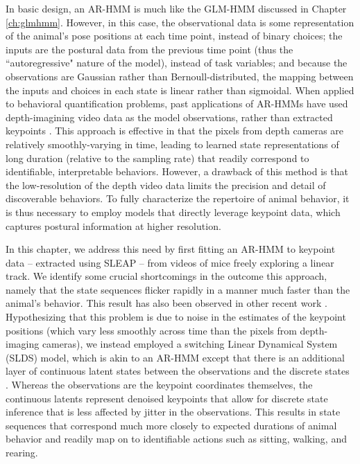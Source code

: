 In basic design, an AR-HMM is much like the GLM-HMM discussed in Chapter \ref{ch:glmhmm}. However, in this case, the observational data is some representation of the animal's pose positions at each time point, instead of binary choices; the inputs are the postural data from the previous time point (thus the ``autoregressive" nature of the model), instead of task variables; and because the observations are Gaussian rather than Bernoull-distributed, the mapping between the inputs and choices in each state is linear rather than sigmoidal. When applied to behavioral quantification problems, past applications of AR-HMMs have used depth-imagining video data as the model observations, rather than extracted keypoints \cite{wiltschko_mapping_2015, markowitz_striatum_2018, wiltschko_revealing_2020}. This approach is effective in that the pixels from depth cameras are relatively smoothly-varying in time, leading to learned state representations of long duration (relative to the sampling rate) that readily correspond to identifiable, interpretable behaviors. However, a drawback of this method is that the low-resolution of the depth video data limits the precision and detail of discoverable behaviors. To fully characterize the repertoire of animal behavior, it is thus necessary to employ models that directly leverage keypoint data, which captures postural information at higher resolution. 

In this chapter, we address this need by first fitting an AR-HMM to keypoint data -- extracted using SLEAP \cite{pereira_sleap_2022} -- from videos of mice freely exploring a linear track. We identify some crucial shortcomings in the outcome this approach, namely that the state sequences flicker rapidly in a manner much faster than the animal's behavior. This result has also been observed in other recent work \cite{wu_deep_2020, luxem_identifying_2022}. Hypothesizing that this problem is due to noise in the estimates of the keypoint positions (which vary less smoothly across time than the pixels from depth-imaging cameras), we instead employed a switching Linear Dynamical System (SLDS) model, which is akin to an AR-HMM except that there is an additional layer of continuous latent states between the observations and the discrete states \cite{ackerson_state_1970, chang_state_1978, fox_nonparametric_2008, murphy_machine_2012, linderman_recurrent_2016, linderman_bayesian_2017}. Whereas the observations are the keypoint coordinates themselves, the continuous latents represent denoised keypoints that allow for discrete state inference that is less affected by jitter in the observations. This results in state sequences that correspond much more closely to expected durations of animal behavior \cite{wiltschko_mapping_2015} and readily map on to identifiable actions such as sitting, walking, and rearing. 

